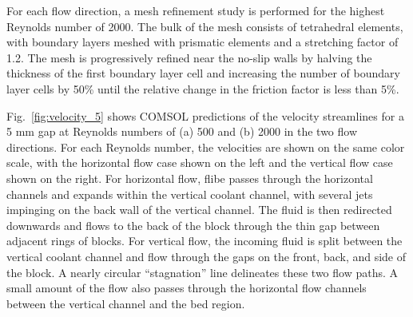 For each flow direction, a mesh refinement study is performed for the highest Reynolds number of 2000. The bulk of the mesh consists of tetrahedral elements, with boundary layers meshed with prismatic elements and a stretching factor of 1.2. The mesh is progressively refined near the no-slip walls by halving the thickness of the first boundary layer cell and increasing the number of boundary layer cells by 50\% until the relative change in the friction factor is less than 5\%.

Fig.\ \ref{fig:velocity_5} shows COMSOL predictions of the velocity streamlines for a 5 \si{\milli\meter} gap at Reynolds numbers of (a) 500 and (b) 2000 in the two flow directions. For each Reynolds number, the velocities are shown on the same color scale, with the horizontal flow case shown on the left and the vertical flow case shown on the right. For horizontal flow, \gls{flibe} passes through the horizontal channels and expands within the vertical coolant channel, with several jets impinging on the back wall of the vertical channel. The fluid is then redirected downwards and flows to the back of the block through the thin gap between adjacent rings of blocks. For vertical flow, the incoming fluid is split between the vertical coolant channel and flow through the gaps on the front, back, and side of the block. A nearly circular ``stagnation'' line delineates these two flow paths. A small amount of the flow also passes through the horizontal flow channels between the vertical channel and the bed region.  

